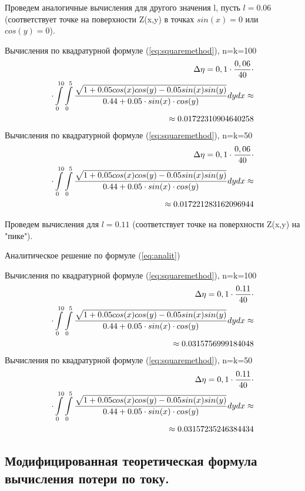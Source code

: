 \documentclass{article}
\begin{document}
Проведем аналогичные вычисления для другого значения l, пусть $l=0.06$ (соответствует точке на поверхности Z(x,y) в точках $sin(x)=0$ или $cos(y)=0$).

Вычисления по квадратурной формуле (\ref{eq:squaremethod}), n=k=100
\begin{align}\label{eq:sq2med10}
\Delta \eta = 0,1 \cdot \frac{0,06}{40} \cdot \notag \\
\cdot \int\limits_0^{10} \int\limits_0^5 \frac{\sqrt{1+0.05cos(x)cos(y)-0.05 sin(x)sin(y)}}{0.44 + 0.05 \cdot sin(x) \cdot cos(y)} dy dx \approx \notag \\ \approx 0.01722310904640258
\end{align}
Вычисления по квадратурной формуле (\ref{eq:squaremethod}), n=k=50
\begin{align}\label{eq:sq2med5}
\Delta \eta = 0,1 \cdot \frac{0,06}{40} \cdot \notag \\
\cdot \int\limits_0^{10} \int\limits_0^5 \frac{\sqrt{1+0.05cos(x)cos(y)-0.05 sin(x)sin(y)}}{0.44 + 0.05 \cdot sin(x) \cdot cos(y)} dy dx \approx \notag \\ \approx 0.017221283162096944
\end{align}

Проведем вычисления для $l=0.11$ (соответствует точке на поверхности Z(x,y) на "пике").

Аналитическое решение по формуле (\ref{eq:analit})

Вычисления по квадратурной формуле (\ref{eq:squaremethod}), n=k=100
\begin{align}\label{eq:sq2max10}
\Delta \eta = 0,1 \cdot \frac{0.11}{40} \cdot \notag \\
\cdot \int\limits_0^{10} \int\limits_0^5 \frac{\sqrt{1+0.05cos(x)cos(y)-0.05 sin(x)sin(y)}}{0.44 + 0.05 \cdot sin(x) \cdot cos(y)} dy dx \approx \notag \\ \approx 0.0315756999184048
\end{align}
Вычисления по квадратурной формуле (\ref{eq:squaremethod}), n=k=50
\begin{align}\label{eq:sq2max5}
\Delta \eta = 0,1 \cdot \frac{0.11}{40} \cdot \notag \\
\cdot \int\limits_0^{10} \int\limits_0^5 \frac{\sqrt{1+0.05cos(x)cos(y)-0.05 sin(x)sin(y)}}{0.44 + 0.05 \cdot sin(x) \cdot cos(y)} dy dx \approx \notag \\ \approx 0.03157235246384434
\end{align}

\subsection{Модифицированная теоретическая формула вычисления потери по току.}\label{sec:mod}
\end{document}
